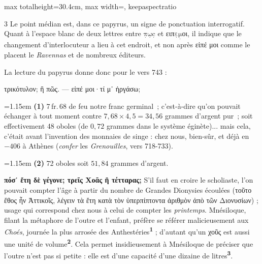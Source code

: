 \documentclass[11pt,twoside]{book}
\newcommand{\italique}[1]{\textit{#1}}
\newcommand{\citComm}[1]{\begin{quoting}[vskip=0.4pt,leftmargin=0.7em,rightmargin=0.2em]#1\end{quoting}}
\newcommand{\grec}[1]{{\policeGr #1}}
\newcommand{\douteux}[1]{$\underset{\cdot}{\text{#1}}$}
\newcommand{\marqueur}[1]{\textsuperscript{\color{rubricRed}\textbf{#1}}}
\begin{document}
\begin{adjustbox}{max totalheight=30.4cm, max width=\textwidth, keepaspectratio}
\begin{minipage}{\textwidth}
{\begin{multicols}{3}
\noindent Le point médian est, dans ce papyrus, un signe de ponctuation interrogatif. Quant à l'espace blanc de deux lettres entre \douteux{π}\douteux{ω}\douteux{c} et ειπ\douteux{ε}\douteux{μ}οι, il indique que le changement d'interlocuteur a lieu à cet endroit, et non après εἰπέ μοι comme le placent le \italique{Ravennas} et de nombreux éditeurs.
\par\vspace{1.5pt}
\noindent La lecture du papyrus donne donc pour le vers 743 :
\citComm{τρικότυλον; ἢ πῶς. --- εἰπέ μοι·τί μ᾽ ἠργάσω;}
\par\vspace{1.5pt}
\par\vspace{1.2pt}\par\nopagebreak\vspace{1pt}\noindent\hangindent=1.15em {\color{sepiaNote}\textbf{(1)}} 7\,fr.\,68 de feu notre franc germinal~; c'est-à-dire qu'on pouvait échanger à tout moment contre $7,68 \times 4,5 = 34,56$ grammes d'argent pur~; soit effectivement 48 oboles (de $0,72$ grammes dans le système éginète)... mais cela, c'était avant l'invention des monnaies de singe : chez nous, bien-sûr, et déjà en $-406$ à Athènes (\italique{confer} les \italique{Grenouilles}, vers 718-733).
\par\vspace{1.5pt}
\noindent\hangindent=1.15em {\color{sepiaNote}\textbf{(2)}} 72 oboles soit $51,84$ grammes d'argent.
\par\vspace{1.5pt}
 \textbf{πόσ᾽ ἔτη δὲ γέγονε; τρεῖς Χοᾶς ἢ τέτταρας;} S'il faut en croire le scholiaste, l'on pouvait compter l'âge à partir du nombre de Grandes Dionysies écoulées (\grec{τοῦτο ἔθος ἦν Ἀττικοῖς, λέγειν τὰ ἔτη κατὰ τὸν ὑπερπίπτοντα ἀριθμὸν ἀπὸ τῶν Διονυσίων}) ; usage qui correspond chez nous à celui de compter les \italique{printemps}. Mnésiloque, filant la métaphore de l'outre et l'enfant, préfère se référer malicieusement aux \italique{Choés}, journée la plus arrosée des Anthestéries\marqueur{1} ; d'autant qu'un \grec{χοῦς} est aussi une unité de volume\marqueur{2}. Cela permet insidieusement à Mnésiloque de préciser que l'outre n'est pas si petite : elle est d'une capacité d'une dizaine de litres\marqueur{3}.
\par\vspace{1.5pt}

\end{multicols}}
\end{minipage}
\end{adjustbox}
\end{document}
